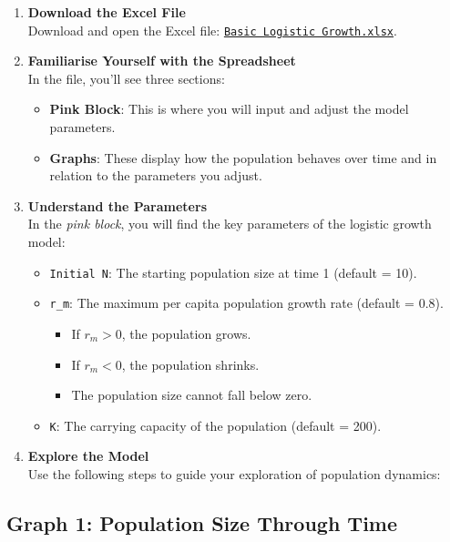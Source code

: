 \documentclass[
  a4paper]{book}
\providecommand{\tightlist}{%
  \setlength{\itemsep}{0pt}\setlength{\parskip}{0pt}}
\begin{document}
\begin{enumerate}
\def\labelenumi{\arabic{enumi}.}
\item
  \textbf{Download the Excel File}\\
  Download and open the Excel file: \href{https://www.dropbox.com/s/oxxyyn4zf4wsvkg/Basic\%20Logistic\%20Growth.xlsx?dl=1}{\texttt{Basic\ Logistic\ Growth.xlsx}}.
\item
  \textbf{Familiarise Yourself with the Spreadsheet}\\
  In the file, you'll see three sections:

  \begin{itemize}
  \tightlist
  \item
    \textbf{Pink Block}: This is where you will input and adjust the model parameters.
  \item
    \textbf{Graphs}: These display how the population behaves over time and in relation to the parameters you adjust.
  \end{itemize}
\item
  \textbf{Understand the Parameters}\\
  In the \emph{pink block}, you will find the key parameters of the logistic growth model:

  \begin{itemize}
  \tightlist
  \item
    \texttt{Initial\ N}: The starting population size at time 1 (default = 10).
  \item
    \texttt{r\_m}: The maximum per capita population growth rate (default = 0.8).

    \begin{itemize}
    \tightlist
    \item
      If \(r_m > 0\), the population grows.
    \item
      If \(r_m < 0\), the population shrinks.
    \item
      The population size cannot fall below zero.
    \end{itemize}
  \item
    \texttt{K}: The carrying capacity of the population (default = 200).
  \end{itemize}
\item
  \textbf{Explore the Model}\\
  Use the following steps to guide your exploration of population dynamics:
\end{enumerate}

\subsection{Graph 1: Population Size Through Time}\label{graph-1-population-size-through-time}
\end{document}
